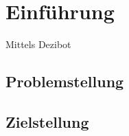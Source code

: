 
\section{Einführung}

Mittels Dezibot~\cite{dezibotteamDezibotDezibot2025}

\subsection{Problemstellung}

\lipsum[1]

\subsection{Zielstellung}

\lipsum[1]
